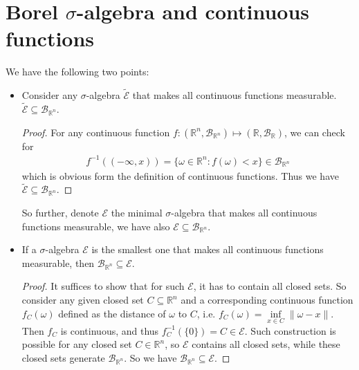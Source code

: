 \documentclass[11pt,a4paper]{article}
\numberwithin{equation}{section}%
\begin{document}
\section{Borel $ \sigma  $-algebra and continuous functions}

We have the following two points:
\begin{itemize}[topsep=2pt,itemsep=0pt]
    \item Consider any $ \sigma  $-algebra $ \tilde{\mathcal{E}} $ that makes all continuous functions measurable. $  \tilde{\mathcal{E}}  \subseteq \mathcal{B}_{\mathbb{R}^n}$.
    
    \begin{proof}
        For any continuous function $ f:(\mathbb{R}^n, \mathcal{B}_{\mathbb{R}^n})\mapsto (\mathbb{R}, \mathcal{B}_{\mathbb{R}}) $, we can check for
        \begin{align*}
            f^{-1}((-\infty, x)) = \{\omega \in \mathbb{R}^n: f(\omega )< x\} \in \mathcal{B}_{\mathbb{R}^n}
        \end{align*}
        which is obvious form the definition of continuous functions. Thus we have $  \tilde{\mathcal{E}}  \subseteq \mathcal{B}_{\mathbb{R}^n}$.
    \end{proof}

    So further, denote $ \mathcal{E} $ the minimal $ \sigma  $-algebra that makes all continuous functions measurable, we have also $  \mathcal{E}  \subseteq \mathcal{B}_{\mathbb{R}^n} $.

    \item If a $ \sigma  $-algebra $ \mathcal{E} $ is the smallest one that makes all continuous functions measurable, then $ \mathcal{B}_{\mathbb{R}^n} \subseteq  \mathcal{E}$.
    
    \begin{proof}
        It suffices to show that for such $ \mathcal{E} $, it has to contain all closed sets. So consider any given closed set $ C\subseteq \mathbb{R}^n $ and a corresponding continuous function $ f_C(\omega ) $ defined as the distance of $ \omega  $ to $ C $, i.e. $ f_C(\omega ) = \mathop{ \inf  }\limits_{x\in C} \|\omega -x\| $. Then $ f_C $ is continuous, and thus $ f_C^{-1}(\{0\}) = C\in \mathcal{E} $. Such construction is possible for any closed set $ C\in\mathbb{R}^n $, so $ \mathcal{E} $ contains all closed sets, while these closed sets generate $ \mathcal{B}_{\mathbb{R}^n} $. So we have $ \mathcal{B}_{\mathbb{R}^n} \subseteq  \mathcal{E} $.
    \end{proof}
\end{itemize}
    
\end{document}

